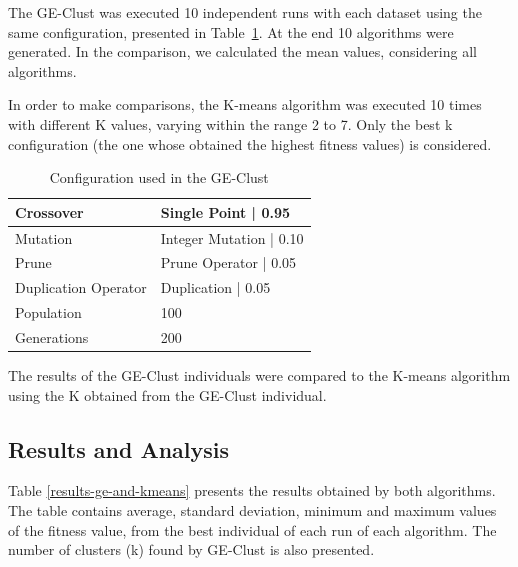 \documentclass[conference]{IEEEtran}
\begin{document}
	
	The GE-Clust was executed 10 independent runs with each dataset using the same configuration, presented in Table~\ref{ge-configuration}. At the end 10 algorithms were generated. In the comparison, we calculated the mean values, considering all algorithms.
	
	
	In order to make comparisons, the K-means algorithm was executed 10 times with different K values, varying within the range 2 to 7. Only the best k configuration (the one whose obtained the highest fitness values) is considered.
	
	
	\begin{table}[]
		\centering
		\caption{Configuration used in the GE-Clust}
		\label{ge-configuration}
		\begin{tabular}{|l|l|}
			\hline
			{Crossover }           & Single Point  | 0.95     \\ \hline
			{Mutation }            & Integer Mutation   |  0.10 \\ \hline
			{Prune  }              & Prune Operator | 0.05   \\ \hline
			{Duplication Operator } & Duplication   | 0.05     \\ \hline
			{Population}                        & 100                               \\ \hline
			{Generations}                       & 200                               \\ \hline
		\end{tabular}
	\end{table}
	
	
	The results of the GE-Clust individuals were compared to the K-means algorithm using the K obtained from the GE-Clust individual.
	
	
	\subsection{Results and Analysis}
	
	Table \ref{results-ge-and-kmeans} presents the results obtained by both algorithms. The table contains average, 
	standard deviation, minimum and maximum values of the fitness value, from the best individual of each run of each algorithm. The number  of clusters (k) found by GE-Clust is also presented.
	
\end{document}

